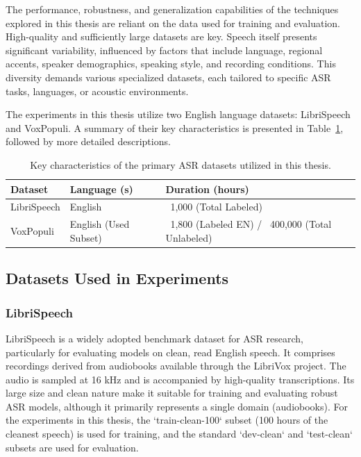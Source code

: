 The performance, robustness, and generalization capabilities of the techniques explored in this thesis are reliant on the data used for training and evaluation. High-quality and sufficiently large datasets are key. Speech itself presents significant variability, influenced by factors that include language, regional accents, speaker demographics, speaking style, and recording conditions. This diversity demands various specialized datasets, each tailored to specific ASR tasks, languages, or acoustic environments.

The experiments in this thesis utilize two English language datasets: LibriSpeech and VoxPopuli. A summary of their key characteristics is presented in Table~\ref{tab:used_asr_datasets_exp}, followed by more detailed descriptions.

\begin{table}[h!]
    \centering
    \small
    \begin{tabular}{|l|l|l|}
        \hline
        \textbf{Dataset} & \textbf{Language (s)} & \textbf{Duration (hours)} \\
        \hline
        LibriSpeech & English & ~1,000 (Total Labeled) \\
        \hline
        VoxPopuli & English (Used Subset) & ~1,800 (Labeled EN) / ~400,000 (Total Unlabeled) \\
        \hline
    \end{tabular}
    \caption{Key characteristics of the primary ASR datasets utilized in this thesis.}
    \label{tab:used_asr_datasets_exp} %
\end{table}

\subsection{Datasets Used in Experiments} %

\subsubsection{LibriSpeech}
LibriSpeech \cite{libri} is a widely adopted benchmark dataset for ASR research, particularly for evaluating models on clean, read English speech. It comprises recordings derived from audiobooks available through the LibriVox project. The audio is sampled at 16 kHz and is accompanied by high-quality transcriptions. Its large size and clean nature make it suitable for training and evaluating robust ASR models, although it primarily represents a single domain (audiobooks). For the experiments in this thesis, the `train-clean-100` subset (100 hours of the cleanest speech) is used for training, and the standard `dev-clean` and `test-clean` subsets are used for evaluation.

